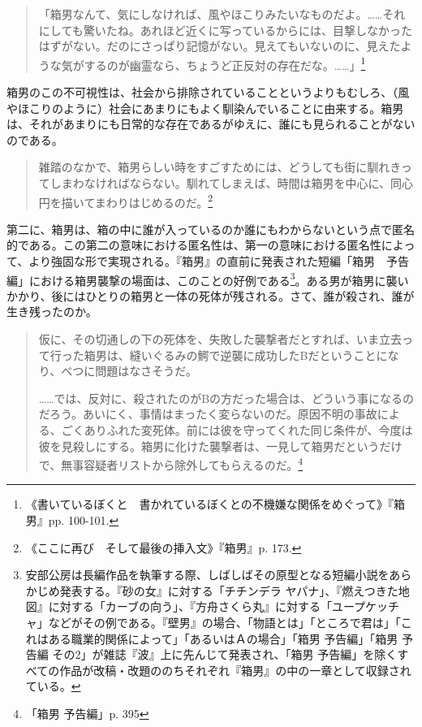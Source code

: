 \documentclass[a4paper]{jsarticle}
\begin{document}
\begin{quotation}
「箱男なんて、気にしなければ、風やほこりみたいなものだよ。……それにしても驚いたね。あれほど近くに写っているからには、目撃しなかったはずがない。だのにさっぱり記憶がない。見えてもいないのに、見えたような気がするのが幽霊なら、ちょうど正反対の存在だな。……」\footnote{《書いているぼくと　書かれているぼくとの不機嫌な関係をめぐって》『箱男』pp. 100-101.}	
\end{quotation}

箱男のこの不可視性は、社会から排除されていることというよりもむしろ、（風やほこりのように）社会にあまりにもよく馴染んでいることに由来する。箱男は、それがあまりにも日常的な存在であるがゆえに、誰にも見られることがないのである。

\begin{quotation}
雑踏のなかで、箱男らしい時をすごすためには、どうしても街に馴れきってしまわなければならない。馴れてしまえば、時間は箱男を中心に、同心円を描いてまわりはじめるのだ。\footnote{《ここに再び　そして最後の挿入文》『箱男』p. 173.}
\end{quotation}

第二に、箱男は、箱の中に誰が入っているのか誰にもわからないという点で匿名的である。この第二の意味における匿名性は、第一の意味における匿名性によって、より強固な形で実現される。『箱男』の直前に発表された短編「箱男　予告編」における箱男襲撃の場面は、このことの好例である\footnote{安部公房は長編作品を執筆する際、しばしばその原型となる短編小説をあらかじめ発表する。『砂の女』に対する「チチンデラ ヤパナ」、『燃えつきた地図』に対する「カーブの向う」、『方舟さくら丸』に対する「ユープケッチャ」などがその例である。『壁男』の場合、「物語とは」「ところで君は」「これはある職業的関係によって」「あるいはＡの場合」「箱男 予告編」「箱男 予告編 その2」が雑誌『波』上に先んじて発表され、「箱男 予告編」を除くすべての作品が改稿・改題ののちそれぞれ『箱男』の中の一章として収録されている。}。ある男が箱男に襲いかかり、後にはひとりの箱男と一体の死体が残される。さて、誰が殺され、誰が生き残ったのか。

\begin{quotation}
仮に、その切通しの下の死体を、失敗した襲撃者だとすれば、いま立去って行った箱男は、縫いぐるみの鰐で逆襲に成功したBだということになり、べつに問題はなさそうだ。

……では、反対に、殺されたのがBの方だった場合は、どういう事になるのだろう。あいにく、事情はまったく変らないのだ。原因不明の事故による、ごくありふれた変死体。前には彼を守ってくれた同じ条件が、今度は彼を見殺しにする。箱男に化けた襲撃者は、一見して箱男だというだけで、無事容疑者リストから除外してもらえるのだ。\footnote{「箱男 予告編」p. 395}
\end{quotation}
\end{document}
